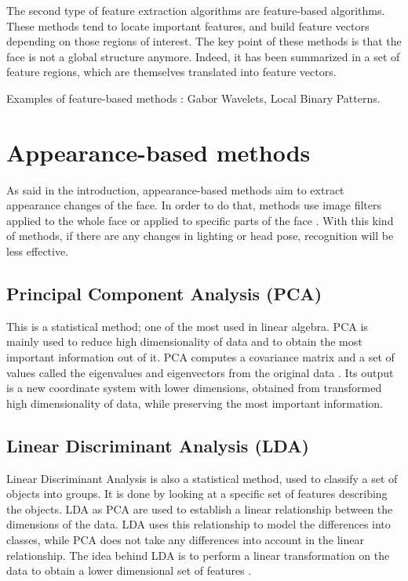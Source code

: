 \noindent The second type of feature extraction algorithms are feature-based algorithms. These methods tend to locate important features, and build feature vectors depending on those regions of interest. The key point of these methods is that the face is not a global structure anymore. Indeed, it has been summarized in a set of feature regions, which are themselves translated into feature vectors.
\vspace{\baselineskip}

\noindent Examples of feature-based methods : Gabor Wavelets, Local Binary Patterns.
\newline

\section{Appearance-based methods}

\noindent As said in the introduction, appearance-based methods aim to extract appearance changes of the face. In order to do that, methods use image filters applied to the whole face or applied to specific parts of the face \cite{SHA09}. With this kind of methods, if there are any changes in lighting or head pose, recognition will be less effective.
\newline

\subsection{Principal Component Analysis (PCA)}

\vspace{\baselineskip}
\noindent This is a statistical method; one of the most used in linear algebra. PCA is mainly used to reduce high dimensionality of data and to obtain the most important information out of it. PCA computes a covariance matrix and a set of values called the eigenvalues and eigenvectors from the original data \cite{GAN08}. Its output is a new coordinate system with lower dimensions, obtained from transformed high dimensionality of data, while preserving the most important information.
\newline

\subsection{Linear Discriminant Analysis (LDA)}

\vspace{\baselineskip}
\noindent Linear Discriminant Analysis is also a statistical method, used to classify a set of objects into groups. It is done by looking at a specific set of features describing the objects. LDA as PCA are used to establish a linear relationship between the dimensions of the data. LDA uses this relationship to model the differences into classes, while PCA does not take any differences into account in the linear relationship. The idea behind LDA  is to perform a linear transformation on the data to obtain a lower dimensional set of features \cite{GAN08}. \newline

